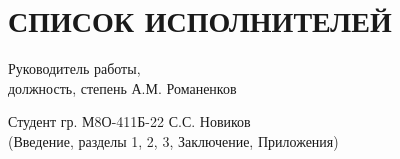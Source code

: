 \chapter*{СПИСОК ИСПОЛНИТЕЛЕЙ}


\noindent Руководитель работы, \\
должность, степень \hfill А.М. Романенков

\vspace{20pt}

\noindent Студент гр. М8О-411Б-22 \hfill С.С. Новиков \\
(Введение, разделы 1, 2, 3, Заключение, Приложения)